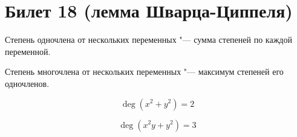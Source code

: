 \setcounter{section}{17}
\section{Билет 18 (лемма Шварца-Циппеля)}
	\begin{Def}
		Степень одночлена от нескольких переменных "--- сумма степеней по каждой переменной.
	\end{Def}
	\begin{Def}
		Степень многочлена от нескольких переменных "--- максимум степеней его одночленов.
	\end{Def}
	\begin{exmp}
		\[ \deg (x^2+y^2) = 2 \]
	\end{exmp}
	\begin{exmp}
		\[ \deg (x^2y + y^2) = 3 \]
	\end{exmp}

